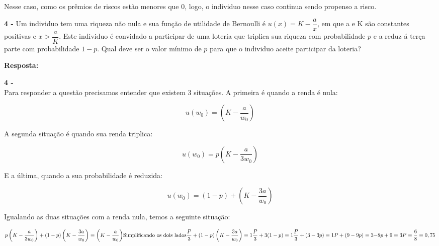 \begin{flushleft}
\begin{enumerate}
	Nesse caso, como os prêmios de riscos estão menores que 0, logo, o individuo nesse caso continua sendo propenso a risco.
\end{enumerate}

\singlespacing


\textbf{4 -} Um individuo tem uma riqueza não nula e sua função de utilidade de Bernoulli é $u(x) = K - \dfrac{a}{x}$, em que a e K são constantes positivas e $x > \dfrac{a}{K}$. Este individuo é convidado a participar de uma loteria que triplica sua riqueza com probabilidade $p$ e a reduz á terça parte com probabilidade $1 - p$. Qual deve ser o valor mínimo de $p$ para que o individuo aceite participar da loteria?

\singlespacing

\textbf{Resposta:}

\singlespacing 

\textbf{4 -} 
\\
Para responder a questão precisamos entender que existem 3 situações. A primeira é quando a renda é nula: 

\begin{equation}
	u(w_{0}) = \left(K - \dfrac{a}{w_{0}}\right) 
\end{equation}

A segunda situação é quando sua renda triplica:

\begin{equation}
	u(w_{0}) =  p\left(K - \dfrac{a}{3w_{0}}\right)
\end{equation}

E a última, quando a sua probabilidade é reduzida:

\begin{equation}
	u(w_{0}) = (1 -p) + \left(K - \dfrac{3a}{w_{0}} \right)
\end{equation}

Igualando as duas situações com a renda nula, temos a seguinte situação:

\begin{equation}
	p \left(K - \dfrac{a}{3w_{0}} \right) + (1 - p) \left(K - \dfrac{3a}{w_{0}} \right) = \left(K - \dfrac{a}{w_{0}} \right)
	$$\\$$
	\text{Simplificando os dois lados}
	$$\\$$
	\dfrac{P}{3} + (1 - p) \left( K - \dfrac{3a}{w_{0}} \right) = 1
	$$\\$$
	\dfrac{P}{3} + 3(1 - p) = 1
	$$\\$$
	\dfrac{P}{3} + (3 - 3p) = 1
	$$\\$$
	P + (9 - 9p) = 3
	$$\\$$
	-8p + 9 = 3
	$$\\$$
	P = \dfrac{6}{8} = 0,75
\end{equation}


\end{flushleft}
